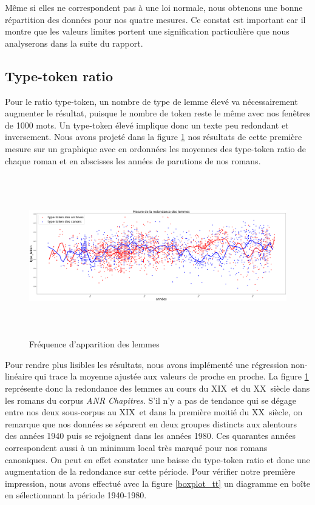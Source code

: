 \documentclass[a4paper,twoside,12pt]{book}
\begin{document}
 Même si elles ne correspondent pas à une loi normale, nous obtenons une bonne répartition des données pour nos quatre mesures. Ce constat est important car il montre que les valeurs limites portent une signification particulière que nous analyserons dans la suite du rapport.


\subsection{Type-token ratio}
Pour le ratio type-token, un nombre de type de lemme élevé va nécessairement augmenter le résultat, puisque le nombre de token reste le même avec nos fenêtres de 1000 mots. Un type-token élevé implique donc un texte peu redondant et inversement. Nous avons projeté dans la figure \ref{type_token_diagram} nos résultats de cette première mesure sur un graphique avec en ordonnées les moyennes des type-token ratio de chaque roman et en abscisses les années de parutions de nos romans. 

\bigskip
\begin{figure}[!ht]
    \centering
    \includegraphics[width=15cm,height=7cm]{img/07_results_type_token_regression.png}
    \caption{Fréquence d'apparition des lemmes}
    \label{type_token_diagram}
\end{figure}

Pour rendre plus lisibles les résultats, nous avons implémenté une régression non-linéaire qui trace la moyenne ajustée aux valeurs de proche en proche. La figure \ref{type_token_diagram} représente donc la redondance des lemmes au cours du XIX\ieme ~et du XX\ieme ~siècle dans les romans du corpus \textit{ANR Chapitres}. S'il n'y a pas de tendance qui se dégage entre nos deux sous-corpus au XIX\ieme ~et dans la première moitié du XX\ieme ~siècle, on remarque que nos données se séparent en deux groupes distincts aux alentours des années 1940 puis se rejoignent dans les années 1980. Ces quarantes années correspondent aussi à un minimum local très marqué pour nos romans canoniques. On peut en effet constater une baisse du type-token ratio et donc une augmentation de la redondance sur cette période. Pour vérifier notre première impression, nous avons effectué avec la figure \ref{boxplot_tt} un diagramme en boîte en sélectionnant la période 1940-1980.
\end{document}
